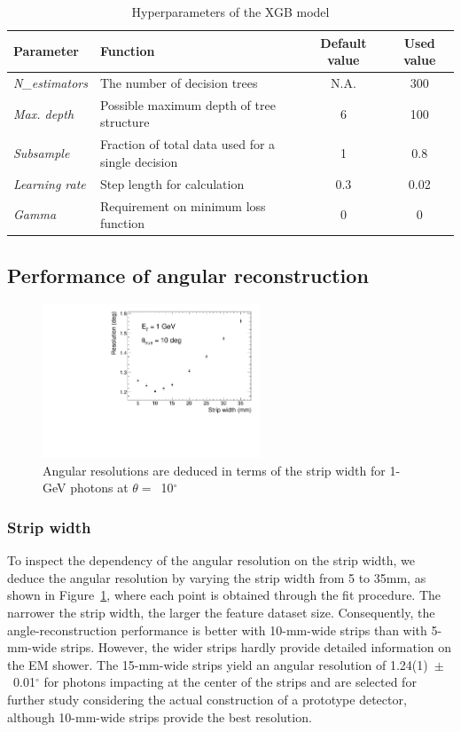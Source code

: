 \documentclass[12pt,times,draftclsnofoot,a4paper]{elsarticle}
\begin{document}
\begin{table}[hbt!]{\small
\centering
\caption{Hyperparameters of the XGB model}
\begin{tabular}{llcc}
\hline 
Parameter & Function & Default value & Used value \\ \hline 
\textit{N\_estimators} & The number of decision trees & N.A. & 300 \\  
\textit{Max. depth} & Possible maximum depth of tree structure & 6 & 100 \\ 
\textit{Subsample} & Fraction of total data used for a single decision & 1 & 0.8 \\ 
\textit{Learning rate} & Step length for calculation & 0.3 & 0.02 \\ 
\textit{Gamma} & Requirement on minimum loss function & 0 & 0 \\ 
\hline
\end{tabular}
\label{tab:XgbPar}
}\end{table}

\subsection{Performance of angular reconstruction}
\label{sec:perf}

\begin{figure}[!hbt]
\centering
\includegraphics[width=0.58\textwidth]{Fig5_width_including7.5_12.5mm.pdf}
\caption{ Angular resolutions are deduced in terms of the strip width for 1-GeV photons at $\theta=$~10$^{\circ}$ }
\label{fig:angle_reco_width}
\end{figure}
\subsubsection{Strip width}
To inspect the dependency of the angular resolution on the strip width, we deduce the angular resolution by varying the strip width from 5 to 35mm, as shown in Figure~\ref{fig:angle_reco_width}, where each point is obtained through the fit procedure. The narrower the strip width, the larger the feature dataset size. Consequently, the angle-reconstruction performance is better with 10-mm-wide strips than with 5-mm-wide strips. However, the wider strips hardly provide detailed information on the EM shower. The 15-mm-wide strips yield an angular resolution of 1.24(1)~$\pm$~0.01$^{\circ}$ for photons impacting at the center of the strips and are selected for further study considering the actual construction of a prototype detector, although 10-mm-wide strips provide the best resolution.
\end{document}
